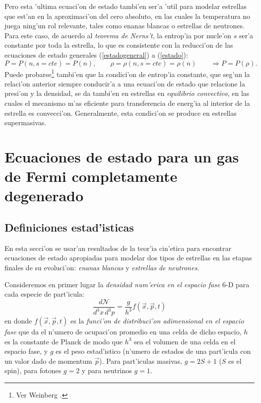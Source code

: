 Pero esta 'ultima ecuaci'on de estado tambi'en ser'a 'util para modelar estrellas que est'an en la aproximaci'on del cero absoluto, en las cuales la temperatura no juega ning'un rol relevante, tales como enanas blancas o estrellas de neutrones. Para este caso, de acuerdo al \textit{teorema de Nerns't}, la entrop'ia por nucle'on $s$ ser'a constante por toda la estrella, lo que es consistente con la reducci'on de las ecuaciones de estado generales (\ref{estadogeneral}) a (\ref{estado}):
\begin{equation}
 P=P(n,s=cte)=P(n),\qquad\rho=\rho(n,s=cte)=\rho(n)\qquad\Rightarrow P=P(\rho).
\end{equation}
Puede probarse\footnote{Ver Weinberg \cite{Weinberg72}.} tambi'en que la condici'on de entrop'ia constante, que seg'un la relaci'on anterior siempre conducir'a a una ecuaci'on de estado que relacione la presi'on y la densidad, se da tambi'en en estrellas en \textit{equilibrio convectivo}, en las cuales el mecanismo m'as eficiente para transferencia de energ'ia al interior de la estrella es convecci'on. Generalmente, esta condici'on se produce en estrellas supermasivas.

\section[Ecuaciones de estado de Fermi]{Ecuaciones de estado para un gas de Fermi completamente degenerado}\label{sec:ecsdeestado}
\subsection{Definiciones estad'isticas}
En esta secci'on se usar'an resultados de la teor'ia cin'etica para encontrar ecuaciones de estado apropiadas para modelar dos tipos de estrellas en las etapas finales de su evoluci'on: \textit{enanas blancas} y \textit{estrellas de neutrones}.

Consideremos en primer lugar la \textit{densidad num'erica en el espacio fase} 6-D para cada especie de part'icula:
\begin{equation}
 \frac{d\mathcal{N}}{d^3x\,d^3p}=\frac{g}{h^3}f(\vec{x},\vec{p},t)
\end{equation}
en donde $f(\vec{x},\vec{p},t)$ es la \textit{funci'on de distribuci'on adimensional en el espacio fase} que da el n'umero de ocupaci'on promedio en una celda de dicho espacio, $h$ es la constante de Planck de modo que $h^3$ sea el volumen de una celda en el espacio fase, y $g$ es el peso estad'istico  (n'umero de estados de una part'icula con un valor dado de momentum $\vec{p}$). Para part'iculas masivas, $g=2S+1$ ($S$ es el spin), para fotones $g=2$ y para neutrinos $g=1$.

